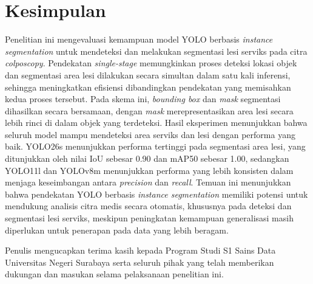 \documentclass {rapidsart}
\theoremstyle{plain}
\theoremstyle{remark}
\theoremstyle{definition}
\begin{document}
\section{Kesimpulan}
Penelitian ini mengevaluasi kemampuan model YOLO berbasis \textit{instance segmentation} untuk mendeteksi dan melakukan segmentasi lesi serviks pada citra \textit{colposcopy}. Pendekatan \textit{single-stage} memungkinkan proses deteksi lokasi objek dan segmentasi area lesi dilakukan secara simultan dalam satu kali inferensi, sehingga meningkatkan efisiensi dibandingkan pendekatan yang memisahkan kedua proses tersebut. Pada skema ini, \textit{bounding box} dan \textit{mask} segmentasi dihasilkan secara bersamaan, dengan \textit{mask} merepresentasikan area lesi secara lebih rinci di dalam objek yang terdeteksi. Hasil eksperimen menunjukkan bahwa seluruh model mampu mendeteksi area serviks dan lesi dengan performa yang baik. YOLO26s menunjukkan performa tertinggi pada segmentasi area lesi, yang ditunjukkan oleh nilai IoU sebesar 0.90 dan mAP50 sebesar 1.00, sedangkan YOLO11l dan YOLOv8m menunjukkan performa yang lebih konsisten dalam menjaga keseimbangan antara \textit{precision} dan \textit{recall}. Temuan ini menunjukkan bahwa pendekatan YOLO berbasis \textit{instance segmentation} memiliki potensi untuk mendukung analisis citra medis secara otomatis, khususnya pada deteksi dan segmentasi lesi serviks, meskipun peningkatan kemampuan generalisasi masih diperlukan untuk penerapan pada data yang lebih beragam.

\begin{acknowledgement}[title={Ucapan Terima Kasih}]
Penulis mengucapkan terima kasih kepada Program Studi S1 Sains Data Universitas Negeri Surabaya serta seluruh pihak yang telah memberikan dukungan dan masukan selama pelaksanaan penelitian ini.
\end{acknowledgement}


\end{document}
